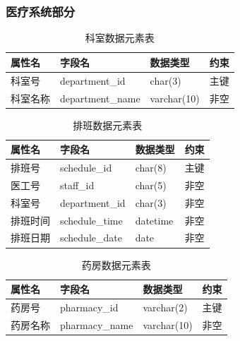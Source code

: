 \documentclass{article}
\begin{document}
\subsubsection{医疗系统部分}

\begin{table}[H]
    \centering
    \begin{tabularx}{\textwidth}{|>{\raggedright\arraybackslash}X|>{\raggedright\arraybackslash}X|>{\raggedright\arraybackslash}X|>{\raggedright\arraybackslash}X|}
    \toprule
    \textbf{属性名} & \textbf{字段名} & \textbf{数据类型} & \textbf{约束} \\ \midrule
    科室号 & department\_id & char(3) & 主键 \\ \midrule
    科室名称 & department\_name & varchar(10) & 非空 \\ \bottomrule
    \end{tabularx}
    \caption{科室数据元素表}
    \label{tab:department_elements}
\end{table}

\begin{table}[H]
    \centering
    \begin{tabularx}{\textwidth}{|>{\raggedright\arraybackslash}X|>{\raggedright\arraybackslash}X|>{\raggedright\arraybackslash}X|>{\raggedright\arraybackslash}X|}
    \toprule
    \textbf{属性名} & \textbf{字段名} & \textbf{数据类型} & \textbf{约束} \\ \midrule
    排班号 & schedule\_id & char(8) & 主键 \\ \midrule
    医工号 & staff\_id & char(5) & 非空 \\ \midrule
    科室号 & department\_id & char(3) & 非空 \\ \midrule
    排班时间 & schedule\_time & datetime & 非空 \\ \midrule
    排班日期 & schedule\_date & date & 非空 \\ \bottomrule
    \end{tabularx}
    \caption{排班数据元素表}
    \label{tab:schedule_elements}
\end{table}

\begin{table}[H]
    \centering
    \begin{tabularx}{\textwidth}{|>{\raggedright\arraybackslash}X|>{\raggedright\arraybackslash}X|>{\raggedright\arraybackslash}X|>{\raggedright\arraybackslash}X|}
    \toprule
    \textbf{属性名} & \textbf{字段名} & \textbf{数据类型} & \textbf{约束} \\ \midrule
    药房号 & pharmacy\_id & varchar(2) & 主键 \\ \midrule
    药房名称 & pharmacy\_name & varchar(10) & 非空 \\ \bottomrule
    \end{tabularx}
    \caption{药房数据元素表}
    \label{tab:pharmacy_elements}
\end{table}
\end{document}

